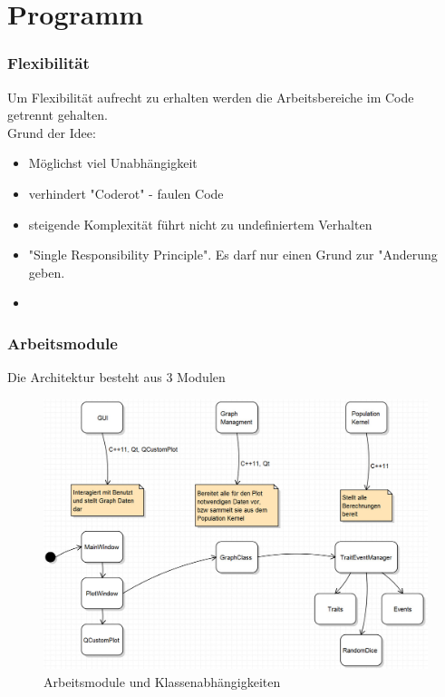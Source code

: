 \documentclass{beamer}
\begin{document}
\section{Programm}
\begin{frame}
	\frametitle{Flexibilität}
	Um Flexibilität aufrecht zu erhalten werden die Arbeitsbereiche im Code getrennt gehalten.\\
	\pause
	Grund der Idee:
	\begin{itemize}
		\item Möglichst viel Unabhängigkeit
		\pause
		\item verhindert "{}Coderot"{} - faulen Code
		\pause
		\item steigende Komplexität führt nicht zu undefiniertem Verhalten
		\pause
		\item "{}Single Responsibility Principle"{}. Es darf nur einen Grund zur "Anderung geben.
		\pause
		\item 
	\end{itemize}
\end{frame}
\begin{frame}
	\frametitle{Arbeitsmodule}
	Die Architektur besteht aus 3 Modulen
	\pause
	\begin{figure}[H]
		\centering
		\includegraphics[width=0.8\linewidth]{./Pictures/Bild_Module}
		\caption[Module]{Arbeitsmodule und Klassenabhängigkeiten}
		\label{Module und Klassen}
	\end{figure}
\end{frame}
\end{document}
